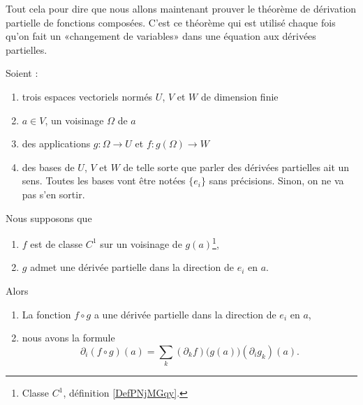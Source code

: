 \begin{normaltext}
	Tout cela pour dire que nous allons maintenant prouver le théorème de dérivation partielle de fonctions composées. C'est ce théorème qui est utilisé chaque fois qu'on fait un «changement de variables» dans une équation aux dérivées partielles.
\end{normaltext}


\begin{theorem}     \label{THOooKBTYooWFtoSF}
	Soient :
	\begin{enumerate}
		\item
		      trois espaces vectoriels normés \( U\), \( V\) et \( W\) de dimension finie
		\item
		      \( a\in V\), un voisinage \( \Omega\) de \( a\)
		\item
		      des applications \( g\colon \Omega\to U\) et \( f\colon g(\Omega)\to W\)
		\item
		      des bases de \( U\), \( V\) et \( W\) de telle sorte que parler des dérivées partielles ait un sens. Toutes les bases vont être notées \( \{ e_i \}\) sans précisions. Sinon, on ne va pas s'en sortir.
	\end{enumerate}
	Nous supposons que
	\begin{enumerate}
		\item
		      \( f\) est de classe \( C^1\) sur un voisinage de \( g(a)\)\footnote{Classe \( C^1\), définition \ref{DefPNjMGqy}.},
		\item
		      \( g\) admet une dérivée partielle dans la direction de \( e_i\) en \( a\).
	\end{enumerate}
	Alors
	\begin{enumerate}
		\item
		      La fonction \( f\circ g\) a une dérivée partielle dans la direction de \( e_i\) en \( a\),
		\item
		      nous avons la formule
		      \begin{equation}        \label{EQooZMAUooIusxgD}
			      \partial_i(f\circ g)(a)=\sum_{k}(\partial_kf)\big( g(a) \big)(\partial_ig_k)(a).
		      \end{equation}
	\end{enumerate}
\end{theorem}

